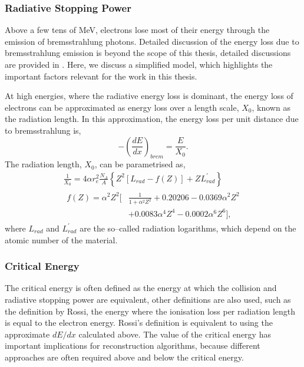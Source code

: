 \subsubsection*{Radiative Stopping Power}
Above a few tens of MeV, electrons lose most of their energy through the 
emission of bremsstrahlung photons. Detailed discussion of the energy loss due
to bremsstrahlung emission is beyond the scope of this thesis, detailed
discussions are provided in \cite{PhysRevD.98.030001, Tsai:1973py}. Here, we 
discuss a simplified model, which highlights the important factors relevant for 
the work in this thesis.

At high energies, where the radiative energy loss is dominant, the energy loss
of electrons can be approximated as energy loss over a length scale, $X_0$,  
known as the radiation length.  In this approximation, the energy loss per 
unit distance due to bremsstrahlung is, 
\begin{equation*}
	- \left( \frac{dE}{dx} \right)_{brem} = \frac{E}{X_0}.
\end{equation*}
The radiation length, $X_0$, can be parametrised as,
\begin{equation}
	\begin{gathered}
		\frac{1}{X_0} = 4 \alpha r_e^2 \frac{N_A}{A} \left\{ Z^2 \left[L_{rad} - f(Z)\right] + Z
		L^\prime_{rad} \right\} \\
		\begin{aligned}
			f(Z) = \alpha^2 Z^2 \bigg[ &\frac{1}{1 + \alpha^2 Z^2} + 0.20206 - 0.0369
			\alpha^2 Z^2 \\ &+ 0.0083 \alpha^4 Z^4 -0.0002 \alpha^6 Z^6 \bigg],
		\end{aligned}
	\end{gathered}
	\label{eq:rad_length}
\end{equation}
where $L_{rad}$ and $L_{rad}^\prime$ are the so--called radiation logarithms,
which depend on the atomic number of the material\cite{Tsai:1973py}.

\subsubsection*{Critical Energy}
The critical energy is often defined as the energy at which the collision and 
radiative stopping power are equivalent, other definitions are also used, such
as the definition by Rossi, the energy where the ionisation loss per
radiation length is equal to the electron energy\cite{Rossi:1952kt}. Rossi's 
definition is equivalent to using the approximate $dE/dx$ calculated 
above\cite{PhysRevD.98.030001}. The value of the critical energy has important 
implications for reconstruction algorithms, because different approaches are 
often required above and below the critical energy. 

